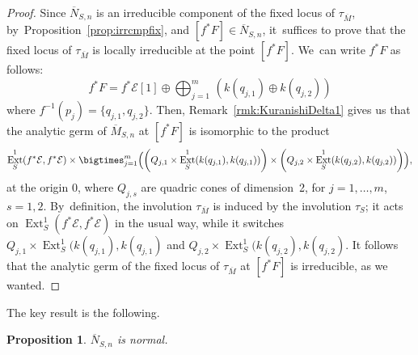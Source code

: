 \documentclass[JEP,XML,SOM,Unicode,published]{cedram}
\newcommand\cE{\mathcal{E}}
\DeclareMathOperator{\Ext}{Ext}
\let\ov\overline
\newtheorem{prop}[lemm]{Proposition}
\theoremstyle{definition}
\begin{document}
\begin{proof}
Since $\overline{N}_{S,n}$ is an irreducible component of the fixed locus of $\tau_{\overline{M}}$, by~Proposition~\ref{prop:irrcmpfix}, and $[f^*F]\in \overline{N}_{S,n}$, it~suffices to prove that the fixed locus of $\tau_{\ov{M}}$ is locally irreducible at the point $[f^*F]$. We~can write $f^*F$ as follows:\vspace*{-3pt}
\[
f^*F=f^*\cE[1]\oplus \bigoplus_{j=1}^m\, \left(k(q_{j,1})\oplus k(q_{j,2})\right)
\]
where $f^{-1}(p_j)=\{q_{j,1},q_{j,2}\}$.
Then, Remark~\ref{rmk:KuranishiDelta1} gives us that the analytic germ of $\ov{M}_{S,n}$ at $[f^*F]$ is isomorphic to the product\vspace*{-3pt}
\[
\Ext^1_S(f^*\cE,f^*\cE)\times\bigtimes_{j=1}^m \Bigl(\left(Q_{j,1}\times \Ext^1_S(k(q_{j,1}),k(q_{j,1}))\right)\times\left(Q_{j,2}\times \Ext^1_S(k(q_{j,2}),k(q_{j,2}))\right)\Bigr),
\]
at the origin $0$, where $Q_{j,s}$ are quadric cones of dimension~2, for $j=1,\dots,m$, $s=1,2$. By~definition, the involution $\tau_{\ov{M}}$ is induced by the involution $\tau_S$; it acts on $\Ext^1_S(f^*\cE,f^*\cE)$ in the usual way, while it switches $Q_{j,1}\times \Ext^1_S(k(q_{j,1}),k(q_{j,1})$ and $Q_{j,2}\times \Ext^1_S(k(q_{j,2}),k(q_{j,2})$.
It follows that the analytic germ of the fixed locus of $\tau_{\ov{M}}$ at $[f^*F]$ is irreducible, as we wanted.
\end{proof}

The key result is the following.

\begin{prop}\label{prop:ennebarnorm}
$\overline{N}_{S,n}$ is normal.
\end{prop}
\end{document}
